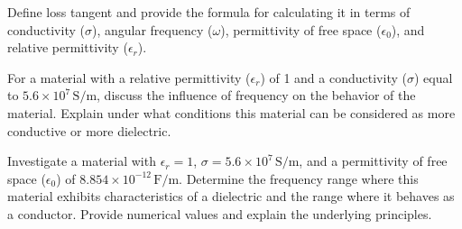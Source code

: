 \begin{mdframed}[backgroundcolor=lightblue, linewidth=1pt,hidealllines=true]
\begin{ExerciseList}
	\Exercise[label={ex11}] Define loss tangent and provide the formula for calculating it in terms of conductivity ($\sigma$), angular frequency ($\omega$), permittivity of free space ($\epsilon_0$), and relative permittivity ($\epsilon_r$).
	
	 \Exercise[label={ex25}] For a material with a relative permittivity ($\epsilon_r$) of 1 and a conductivity ($\sigma$) equal to $5.6 \times 10^7 \, \text{S/m}$, discuss the influence of frequency on the behavior of the material. Explain under what conditions this material can be considered as more conductive or more dielectric.
	
	
	
	\Exercise[label={ex26}] Investigate a material with $\epsilon_r=1$, $\sigma=5.6 \times 10^7 \, \text{S/m}$, and a permittivity of free space ($\epsilon_0$) of $8.854 \times 10^{-12} \, \text{F/m}$. Determine the frequency range where this material exhibits characteristics of a dielectric and the range where it behaves as a conductor. Provide numerical values and explain the underlying principles.
	
	\end{ExerciseList}
\end{mdframed}